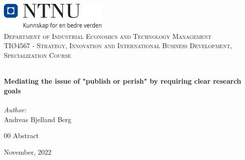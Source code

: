 
\begin{titlepage}
\vbox{ }
\vbox{ }
\begin{center}
\includegraphics[width=0.40\textwidth]{Images/NTNU_logo.png}\\[1cm]
\textsc{\LARGE Department of Industrial Economics and Technology Management}\\[1.5cm]
\textsc{\Large TIØ4567 - Strategy, Innovation and International Business Development, Specialization Course}\\[0.5cm]
\vbox{ }

\HRule \\[0.4cm]
{ \huge \bfseries Mediating the issue of "publish or perish" by requiring clear research goals }\\[0.4cm]
\HRule \\[1.5cm]

\large
\emph{Author:}\\
Andreas Bjelland Berg
\vfill


{00 Abstract}


\vfill
{\large November, 2022}
\end{center}
\end{titlepage}